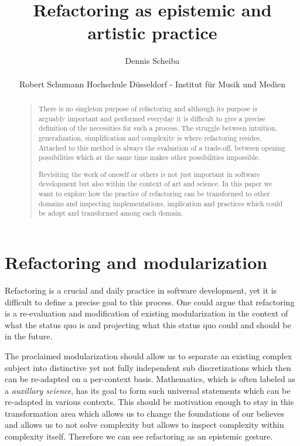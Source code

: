 \documentclass[10pt,twocolumn,letterpaper]{article}
\newcommand\email[1]{\small{\href{mailto:#1}{\color{black}{\nolinkurl{#1}}}}}
\begin{document}
\title{Refactoring as epistemic and artistic practice}

\author{Dennis Scheiba\\
\email{dennis.scheiba@rsh-duesseldorf.de}\\
Robert Schumann Hochschule Düsseldorf - Institut für Musik und Medien\\
}
\maketitle

\begin{abstract}

\begin{quote}
There is no singleton purpose of refactoring and although its purpose is arguably important and performed everyday it is difficult to give a precise definition of the necessities for such a process.
The struggle between intuition, generalization, simplification and complexity is where refactoring resides.
Attached to this method is always the evaluation of a trade-off, between opening possibilities which at the same time makes other possibilities impossible.

Revisiting the work of oneself or others is not just important in software development but also within the context of art and science.
In this paper we want to explore how the practice of refactoring can be transformed to other domains and inspecting implementations, implication and practices which could be adopt and transformed among each domain.
\end{quote}
\end{abstract}

\vspace{-1em}

\section{Refactoring and modularization} \label{what}

Refactoring is a crucial and daily practice in software development, yet it is difficult to define a precise goal to this process.
One could argue that refactoring is a re-evaluation and modification of existing modularization in the context of what the status quo is and projecting what this status quo could and should be in the future.

The proclaimed modularization should allow us to separate an existing complex subject into distinctive yet not fully independent sub discretizations which then can be re-adapted on a per-context basis.
Mathematics, which is often labeled as a \textit{auxillary science}, has its goal to form such universal statements which can be re-adapted in various contexts.
This should be motivation enough to stay in this transformation area which allows us to change the foundations of our believes and allows us to not solve complexity but allows to inspect complexity within complexity itself.
Therefore we can see refactoring as an epistemic gesture.
\end{document}
